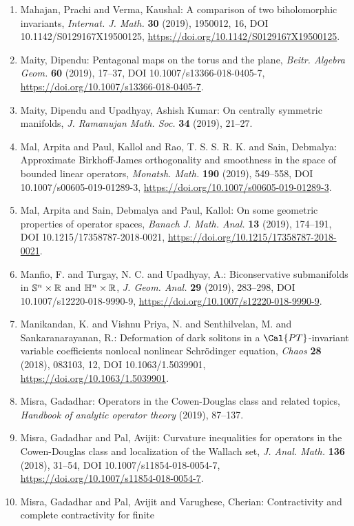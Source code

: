 \begin{enumerate}
\item Mahajan, Prachi and Verma, Kaushal: A comparison of two biholomorphic invariants, \emph{Internat. J. Math.} {\bf 30} (2019), 1950012, 16, DOI 10.1142/S0129167X19500125, \url{https://doi.org/10.1142/S0129167X19500125}.
\item Maity, Dipendu: Pentagonal maps on the torus and the plane, \emph{Beitr. Algebra Geom.} {\bf 60} (2019), 17--37, DOI 10.1007/s13366-018-0405-7, \url{https://doi.org/10.1007/s13366-018-0405-7}.
\item Maity, Dipendu and Upadhyay, Ashish Kumar: On centrally symmetric manifolds, \emph{J. Ramanujan Math. Soc.} {\bf 34} (2019), 21--27.
\item Mal, Arpita and Paul, Kallol and Rao, T. S. S. R. K. and Sain,
Debmalya: Approximate {B}irkhoff-{J}ames orthogonality and smoothness in
the space of bounded linear operators, \emph{Monatsh. Math.} {\bf 190} (2019), 549--558, DOI 10.1007/s00605-019-01289-3, \url{https://doi.org/10.1007/s00605-019-01289-3}.
\item Mal, Arpita and Sain, Debmalya and Paul, Kallol: On some geometric properties of operator spaces, \emph{Banach J. Math. Anal.} {\bf 13} (2019), 174--191, DOI 10.1215/17358787-2018-0021, \url{https://doi.org/10.1215/17358787-2018-0021}.
\item Manfio, F. and Turgay, N. C. and Upadhyay, A.: Biconservative submanifolds in {$\Bbb{S}^n\times\Bbb{R}$} and
{$\Bbb{H}^n\times\Bbb{R}$}, \emph{J. Geom. Anal.} {\bf 29} (2019), 283--298, DOI 10.1007/s12220-018-9990-9, \url{https://doi.org/10.1007/s12220-018-9990-9}.
\item Manikandan, K. and Vishnu Priya, N. and Senthilvelan, M. and
Sankaranarayanan, R.: Deformation of dark solitons in a {$\Cal{PT}$}-invariant
variable coefficients nonlocal nonlinear {S}chr\"{o}dinger
equation, \emph{Chaos} {\bf 28} (2018), 083103, 12, DOI 10.1063/1.5039901, \url{https://doi.org/10.1063/1.5039901}.
\item Misra, Gadadhar: Operators in the {C}owen-{D}ouglas class and related topics, \emph{Handbook of analytic operator theory} {\bf } (2019), 87--137.
\item Misra, Gadadhar and Pal, Avijit: Curvature inequalities for operators in the {C}owen-{D}ouglas
class and localization of the {W}allach set, \emph{J. Anal. Math.} {\bf 136} (2018), 31--54, DOI 10.1007/s11854-018-0054-7, \url{https://doi.org/10.1007/s11854-018-0054-7}.
\item Misra, Gadadhar and Pal, Avijit and Varughese, Cherian: Contractivity and complete contractivity for finite

\end{enumerate}

